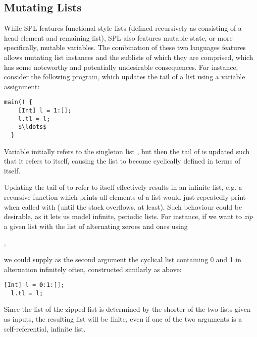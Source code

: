 \subsection{Mutating Lists}
While SPL features functional-style lists (defined recursively as consisting of
a head element and remaining list), SPL also features mutable state, or more
specifically, mutable variables.
The combination of these two languages features allows mutating list instances
and the sublists of which they are comprised, which has some noteworthy and
potentially undesirable consequences.
For instance, consider the following program, which updates the tail of a list
using a variable assignment:
%
\begin{lstlisting}[language=spl]
  main() {
    [Int] l = 1:[];
    l.tl = l;
    $\ldots$
  }
\end{lstlisting}

Variable  initially refers to the singleton list , but then the
tail of  is updated such that it refers to  itself, causing the
list to become cyclically defined in terms of itself.

Updating the tail of  to refer to  itself effectively results in
an infinite list, e.g. a recursive function which prints all elements of a list
would just repeatedly print  when called with  (until the stack
overflows, at least).
Such behaviour could be desirable, as it lets us model infinite, periodic lists.
For instance, if we want to \emph{zip} a given list with the list of alternating
zeroes and ones using
\begin{center}
  ,
\end{center}
we could supply as the second argument the cyclical list containing 0 and 1 in
alternation infinitely often, constructed similarly as above:
\begin{lstlisting}[language=spl]
  [Int] l = 0:1:[];
  l.tl = l;
\end{lstlisting}
%
Since the list of the zipped list is determined by the shorter of the two lists
given as inputs, the resulting list will be finite, even if one of the two
arguments is a self-referential, infinite list.




